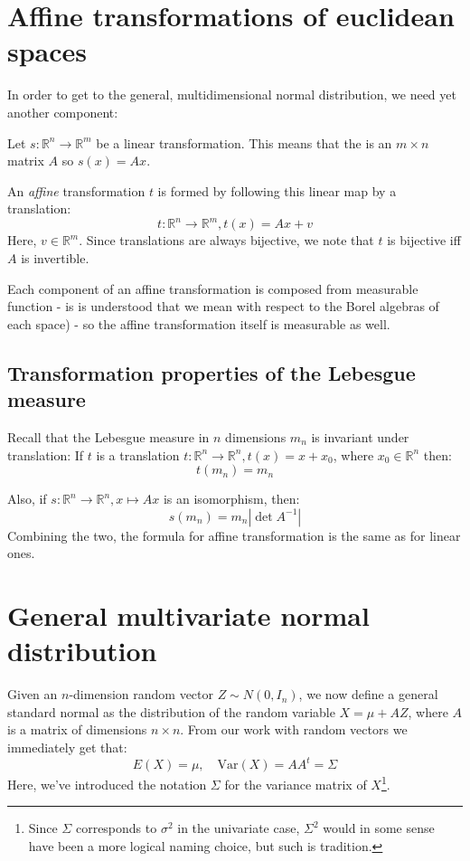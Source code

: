 \documentclass[12pt, a4paper]{article}
\numberwithin{equation}{section}
\begin{document}
\section{Affine transformations of euclidean spaces}
In order to get to the general, multidimensional normal distribution, we need yet another component:

Let $s:\mathbb{R}^n\rightarrow\mathbb{R}^m$ be a linear transformation. This means that the is an $m\times n$ matrix $A$ so $s(x)=Ax$.

An \textit{affine} transformation $t$ is formed by following this linear map by a translation:
\begin{equation}
t:\mathbb{R}^n\rightarrow\mathbb{R}^m, t(x)=Ax+v
\end{equation}
Here, $v\in\mathbb{R}^m$. Since translations are always bijective, we note that $t$ is bijective iff $A$ is invertible.

Each component of an affine transformation is composed from measurable function - is is understood that we mean with respect to the Borel algebras of each space) - so the affine transformation itself is measurable as well.

\subsection{Transformation properties of the Lebesgue measure}
\label{euclidean_lebesgue_properties}
Recall that the Lebesgue measure in $n$ dimensions $m_n$ is invariant under translation: If $t$ is a translation $t:\mathbb{R}^n\rightarrow\mathbb{R}^n, t(x)=x+x_0$, where $x_0\in\mathbb{R}^n$ then:
\begin{equation}
t(m_n)=m_n
\end{equation}

Also, if $s:\mathbb{R}^n\rightarrow\mathbb{R}^n, x\mapsto Ax$ is an isomorphism, then:
\begin{equation}
\label{lebesgue_transform}
s(m_n)=m_n|\det A^{-1}|
\end{equation}
Combining the two, the formula for affine transformation is the same as for linear ones.

\section{General multivariate normal distribution}
Given an $n$-dimension random vector $Z\sim N(0,I_n)$, we now define a general standard normal as the distribution of the random variable $X=\mu+AZ$, where $A$ is a matrix of dimensions $n\times n$. From our work with random vectors we immediately get that:
\begin{equation}
E(X)=\mu,\quad \textrm{Var}(X)=AA^t=\Sigma
\end{equation}
Here, we've introduced the notation $\Sigma$ for the variance matrix of $X$\footnote{Since $\Sigma$ corresponds to $\sigma^2$ in the univariate case, $\Sigma^2$ would in some sense have been a more logical naming choice, but such is tradition.}.
\end{document}
